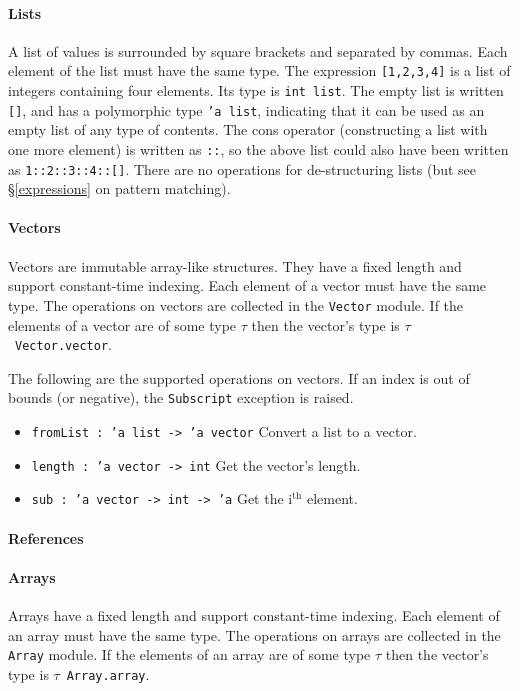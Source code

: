 \documentclass{article}
\begin{document}
\paragraph{Lists} A list of values is surrounded by square brackets and separated by commas. Each element of the list must have the same type. The expression \texttt{[1,2,3,4]} is a list of integers containing four elements. Its type is \texttt{int list}. The empty list is written \texttt{[]}, and has a polymorphic type \texttt{'a list}, indicating that it can be used as an empty list of any type of contents. The cons operator (constructing a list with one more element) is written as \texttt{::}, so the above list could also have been written as \texttt{1::2::3::4::[]}. There are no operations for de-structuring lists (but see \S\ref{expressions} on pattern matching).

\paragraph{Vectors}

Vectors are immutable array-like structures. They have a fixed length and support constant-time indexing. Each element of a vector must have the same type. The operations on vectors are collected in the \texttt{Vector} module. If the elements of a vector are of some type $\tau$ then the vector's type is $\tau$\ \texttt{Vector.vector}.

The following are the supported operations on vectors. If an index is out of bounds (or negative), the \texttt{Subscript} exception is raised.
\begin{itemize}
\item \texttt{fromList : 'a list -> 'a vector} Convert a list to a vector.
\item \texttt{length : 'a vector -> int} Get the vector's length.
\item \texttt{sub : 'a vector -> int -> 'a} Get the i$^\textrm{th}$ element.
\end{itemize}

\paragraph{References}

\paragraph{Arrays}

Arrays have a fixed length and support constant-time indexing. Each element of an array must have the same type. The operations on arrays are collected in the \texttt{Array} module. If the elements of an array are of some type $\tau$ then the vector's type is $\tau$\ \texttt{Array.array}.
\end{document}
